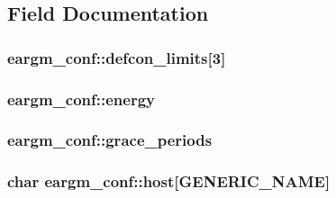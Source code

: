\subsection{Field Documentation}
\subsubsection[{\texorpdfstring{defcon\+\_\+limits}{defcon_limits}}]{ eargm\+\_\+conf\+::defcon\+\_\+limits\mbox{[}3\mbox{]}}\hypertarget{structeargm__conf_a52fa8e2922a072dc2b577a9e14a02284}{}\label{structeargm__conf_a52fa8e2922a072dc2b577a9e14a02284}
\subsubsection[{\texorpdfstring{energy}{energy}}]{ eargm\+\_\+conf\+::energy}\hypertarget{structeargm__conf_a8a95ddc3dd089a447714e2828155f5f3}{}\label{structeargm__conf_a8a95ddc3dd089a447714e2828155f5f3}
\subsubsection[{\texorpdfstring{grace\+\_\+periods}{grace_periods}}]{ eargm\+\_\+conf\+::grace\+\_\+periods}\hypertarget{structeargm__conf_a343e48b700356d9c363ee2aa7399e58c}{}\label{structeargm__conf_a343e48b700356d9c363ee2aa7399e58c}
\subsubsection[{\texorpdfstring{host}{host}}]{\setlength{\rightskip}{0pt plus 5cm}char eargm\+\_\+conf\+::host\mbox{[}{\bf G\+E\+N\+E\+R\+I\+C\+\_\+\+N\+A\+ME}\mbox{]}}\hypertarget{structeargm__conf_a35efd5e16a99666d3cd1471b696d2845}{}\label{structeargm__conf_a35efd5e16a99666d3cd1471b696d2845}
